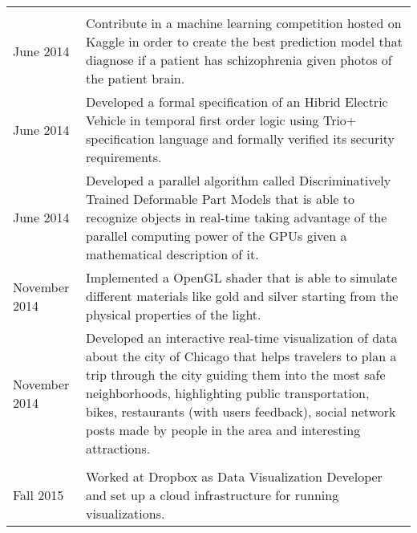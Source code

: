 \begin{longtable}{>{\setlength\hsize{.4\hsize}}X>{\setlength\hsize{1.6\hsize}}X}
\multicolumn{2}{l}{PROJECTS} \\
June 2014 & Contribute in a machine learning competition hosted on Kaggle in order to create the best prediction model that diagnose if a patient has schizophrenia given photos of the patient brain. \\
June 2014 & Developed a formal specification of an Hibrid Electric Vehicle in temporal first order logic using Trio+ specification language and formally verified its security requirements. \\
June 2014 & Developed a parallel algorithm called Discriminatively Trained Deformable Part Models that is able to recognize objects in real-time taking advantage of the parallel computing power of the GPUs given a mathematical description of it. \\
November 2014 & Implemented a OpenGL shader that is able to simulate different materials like gold and silver starting from the physical properties of the light. \\
November 2014 & Developed an interactive real-time visualization of data about the city of Chicago that helps travelers to plan a trip through the city guiding them into the most safe neighborhoods, highlighting public transportation, bikes, restaurants (with users feedback), social network posts made by people in the area and interesting attractions. \\
\hline	

\multicolumn{2}{l}{WORK EXPERIENCE} \\
Fall 2015 & Worked at Dropbox as Data Visualization Developer and set up a cloud infrastructure for running visualizations. \\
\hline	
\end{longtable}
